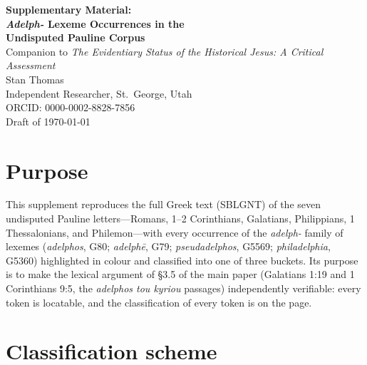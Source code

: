 \documentclass[11pt,oneside]{article}
\begin{document}
\begin{center}
  {\LARGE\bfseries Supplementary Material:\\[4pt]
   \textit{Adelph-} Lexeme Occurrences in the\\[2pt]
   Undisputed Pauline Corpus}\\[18pt]
  {\large Companion to \textit{The Evidentiary Status of the Historical Jesus: A Critical Assessment}}\\[6pt]
  {\normalsize Stan Thomas}\\[4pt]
  {\normalsize Independent Researcher, St.\ George, Utah\\
   ORCID: 0000-0002-8828-7856}\\[12pt]
  {\normalsize Draft of \today}
\end{center}

\vspace{1em}

\section*{Purpose}

This supplement reproduces the full Greek text (SBLGNT) of the seven
undisputed Pauline letters---Romans, 1--2 Corinthians, Galatians,
Philippians, 1 Thessalonians, and Philemon---with every occurrence of
the \textit{adelph-} family of lexemes (\textit{adelphos}, G80;
\textit{adelph\=e}, G79; \textit{pseudadelphos}, G5569;
\textit{philadelphia}, G5360) highlighted in colour and classified into
one of three buckets.  Its purpose is to make the lexical argument of
\S3.5 of the main paper (Galatians 1:19 and 1 Corinthians 9:5, the
\textit{adelphos tou kyriou} passages) independently verifiable: every
token is locatable, and the classification of every token is on the
page.

\section*{Classification scheme}
\end{document}
